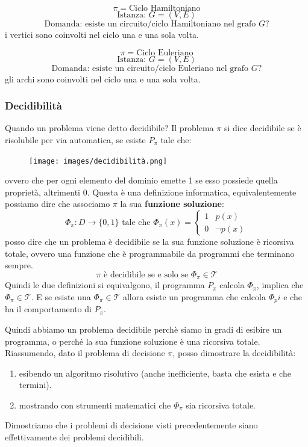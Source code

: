 \documentclass{article}
\begin{document}
$$\pi=\text{Ciclo Hamiltoniano}$$
$$\text{Istanza: }G=(V,E)$$
$$\text{Domanda: esiste un circuito/ciclo Hamiltoniano nel grafo }G?$$
i vertici sono coinvolti nel ciclo una e una sola volta.

$$\pi=\text{Ciclo Euleriano}$$
$$\text{Istanza: }G=(V,E)$$
$$\text{Domanda: esiste un circuito/ciclo Euleriano nel grafo }G?$$
gli archi sono coinvolti nel ciclo una e una sola volta.

\subsubsection{Decidibilità}
Quando un problema viene detto decidibile? Il problema $\pi$ si dice decidibile se è risolubile
per via automatica, se esiste $P_\pi$ tale che:
\begin{figure}[H]
    \centering
    \texttt{[image: images/decidibilità.png]}
\end{figure}
ovvero che per ogni elemento del dominio emette 1 se esso possiede quella proprietà, altrimenti 0.
Questa è una definizione informatica, equivalentemente possiamo dire che associamo
$\pi$ la sua \textbf{funzione soluzione}:
\[
    \Phi_\pi:D\rightarrow\{0,1\}\text{ tale che }\Phi_\pi(x)=
    \begin{cases}
        1 & p(x)       \\
        0 & \lnot p(x)
    \end{cases}
\]
posso dire che un problema è decidibile se la sua funzione soluzione è ricorsiva totale,
ovvero una funzione che è programmabile da programmi che terminano sempre.
$$\pi\text{ è decidibile se e solo se }\Phi_\pi\in\mathcal{T}$$
Quindi le due definizioni si equivalgono, il programma $P_\pi$ calcola $\Phi_\pi$, implica
che $\Phi_\pi\in\mathcal{T}$. E se esiste una $\Phi_\pi\in\mathcal{T}$ allora esiste un
programma che calcola $\Phi_pi$ e che ha il comportamento di $P_\pi$.

Quindi abbiamo un problema decidibile perchè siamo in gradi di esibire un programma, o perché
la sua funzione soluzione è una ricorsiva totale. Riassumendo, dato il problema di decisione
$\pi$, posso dimostrare la decidibilità:
\begin{enumerate}
    \item esibendo un algoritmo risolutivo (anche inefficiente, basta che esista e che termini).
    \item mostrando con strumenti matematici che $\Phi_\pi$ sia ricorsiva totale.
\end{enumerate}
Dimostriamo che i problemi di decisione visti precedentemente siano effettivamente
dei problemi decidibili.
\end{document}
